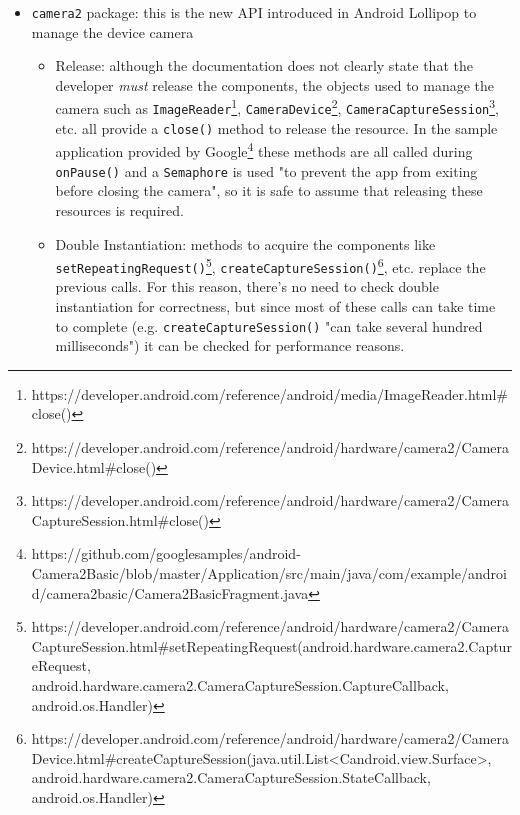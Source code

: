 \documentclass[11pt,a4paper,notitlepage]{article}
\begin{document}
\begin{itemize}
\begin{itemize}
\begin{itemize}
				\item Best Practices: the best practice is to acquire the camera during \texttt{onResume()} and release it during \texttt{onPause()}\footnote{https://developer.android.com/reference/android/hardware/Camera.html}.
				\item Double Instantiation: if the developer tries to acquire the camera twice, the system will throw a runtime exception\footnote{https://developer.android.com/reference/android/hardware/Camera.html\#open(int)}.
			\end{itemize}
			\item \texttt{camera2} package: this is the new API introduced in Android Lollipop to manage the device camera
			\begin{itemize}
				\item Release: although the documentation does not clearly state that the developer \textit{must} release the components, the objects used to manage the camera such as \texttt{ImageReader}\footnote{https://developer.android.com/reference/android/media/ImageReader.html\#close()}, \texttt{CameraDevice}\footnote{https://developer.android.com/reference/android/hardware/camera2/CameraDevice.html\#close()}, \texttt{CameraCaptureSession}\footnote{https://developer.android.com/reference/android/hardware/camera2/CameraCaptureSession.html\#close()}, etc. all provide a \texttt{close()} method to release the resource. In the sample application provided by Google\footnote{https://github.com/googlesamples/android-Camera2Basic/blob/master/Application/src/main/java/com/example/android/camera2basic/Camera2BasicFragment.java} these methods are all called during \texttt{onPause()} and a \texttt{Semaphore} is used "to prevent the app from exiting before closing the camera", so it is safe to assume that releasing these resources is required.
				\item Double Instantiation: methods to acquire the components like \texttt{setRepeatingRequest()}\footnote{https://developer.android.com/reference/android/hardware/camera2/CameraCaptureSession.html\#setRepeatingRequest(android.hardware.camera2.CaptureRequest, android.hardware.camera2.CameraCaptureSession.CaptureCallback, android.os.Handler)}, \texttt{createCaptureSession()}\footnote{https://developer.android.com/reference/android/hardware/camera2/CameraDevice.html\#createCaptureSession(java.util.List<Candroid.view.Surface>, android.hardware.camera2.CameraCaptureSession.StateCallback, android.os.Handler)}, etc. replace the previous calls. For this reason, there's no need to check double instantiation for correctness, but since most of these calls can take time to complete (e.g. \texttt{createCaptureSession()} "can take several hundred milliseconds") it can be checked for performance reasons.

\end{itemize}
\end{itemize}
\end{itemize}
\end{document}
